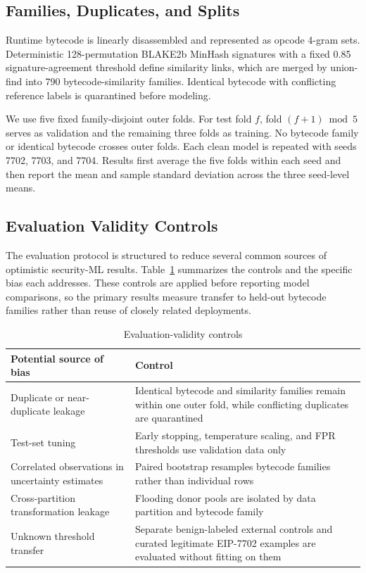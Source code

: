 \documentclass[conference]{IEEEtran}
\begin{document}
\subsection{Families, Duplicates, and Splits}

Runtime bytecode is linearly disassembled and represented as opcode 4-gram sets. Deterministic 128-permutation BLAKE2b MinHash signatures with a fixed 0.85 signature-agreement threshold define similarity links, which are merged by union-find into 790 bytecode-similarity families. Identical bytecode with conflicting reference labels is quarantined before modeling.

We use five fixed family-disjoint outer folds. For test fold $f$, fold $(f+1)\bmod5$ serves as validation and the remaining three folds as training. No bytecode family or identical bytecode crosses outer folds. Each clean model is repeated with seeds 7702, 7703, and 7704. Results first average the five folds within each seed and then report the mean and sample standard deviation across the three seed-level means.

\subsection{Evaluation Validity Controls}

The evaluation protocol is structured to reduce several common sources of optimistic security-ML results. Table~\ref{tab:validity-controls} summarizes the controls and the specific bias each addresses. These controls are applied before reporting model comparisons, so the primary results measure transfer to held-out bytecode families rather than reuse of closely related deployments.

\begin{table}[t]
\centering
\caption{Evaluation-validity controls}
\label{tab:validity-controls}
\scriptsize
\begin{tabularx}{\columnwidth}{@{}X X@{}}
\toprule
Potential source of bias & Control \\
\midrule
Duplicate or near-duplicate leakage & Identical bytecode and similarity families remain within one outer fold, while conflicting duplicates are quarantined \\
Test-set tuning & Early stopping, temperature scaling, and FPR thresholds use validation data only \\
Correlated observations in uncertainty estimates & Paired bootstrap resamples bytecode families rather than individual rows \\
Cross-partition transformation leakage & Flooding donor pools are isolated by data partition and bytecode family \\
Unknown threshold transfer & Separate benign-labeled external controls and curated legitimate EIP-7702 examples are evaluated without fitting on them \\
\bottomrule
\end{tabularx}
\end{table}
\end{document}
